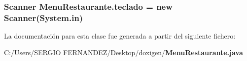 \subsubsection[{teclado}]{\setlength{\rightskip}{0pt plus 5cm}Scanner {\bf MenuRestaurante.teclado} = new Scanner(System.in)\hspace{0.3cm}{\tt  [static, package]}}\label{class_menu_restaurante_c408f0f11dacfacc580a28486a6fd498}




La documentación para esta clase fue generada a partir del siguiente fichero:\begin{CompactItemize}
\item 
C:/Users/SERGIO FERNANDEZ/Desktop/doxigen/{\bf MenuRestaurante.java}\end{CompactItemize}
